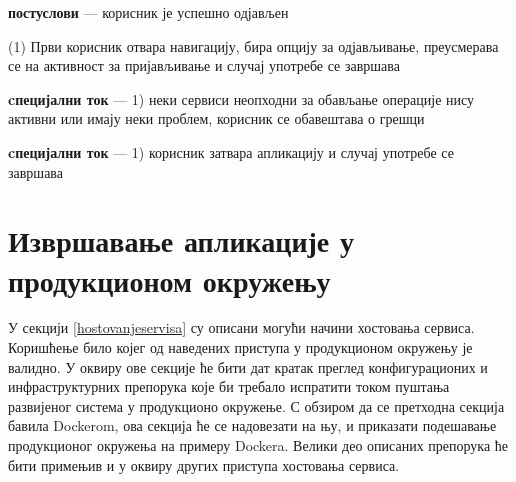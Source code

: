 \documentclass[12pt,oneside]{memoir}
\begin{document}
\begin{itemize}
\begin{description}
            \item \textbf{постуслови} --- корисник је успешно одјављен
            \item (1) Први корисник отвара навигацију, бира опцију за одјављивање, преусмерава се на активност за пријављивање и случај употребе се завршава
            \item \textbf{cпецијални ток} --- 1) неки сервиси неопходни за обављање операције нису активни или имају неки проблем, корисник се обавештава о грешци
            \item \textbf{cпецијални ток} --- 1) корисник затвара апликацију и случај употребе се завршава
        \end{description}
\end{itemize}

\section{Извршавање апликације у продукционом окружењу}
У секцији \ref{hostovanjeservisa} су описани могући начини хостовања сервиса. Коришћење било којег од наведених приступа у продукционом окружењу је валидно. У оквиру ове секције ће бити дат кратак преглед конфигурационих и инфраструктурних препорука које би требало испратити током пуштања развијеног система у продукционо окружење. С обзиром да се претходна секција бавила Dockerom, ова секција ће се надовезати на њу, и приказати подешавање продукционог окружења на примеру Dockera. Велики део описаних препорука ће бити примењив и у оквиру других приступа хостовања сервиса.
\end{document}

